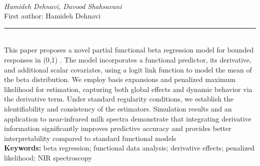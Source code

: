 \documentclass[10pt,twoside]{article}
\begin{document}
\noindent\begin{minipage}[t][\textheight]{\textwidth}
\\[0.35em]
{\itshape Hamideh Dehnavi, Davood Shahsavani}\\[0.2em]
{\footnotesize First author: Hamideh Dehnavi}\\[0.45em]
\noindent\rule{\textwidth}{0.3pt}\\[0.4em]
{\footnotesize This paper proposes a novel partial functional beta regression model for bounded responses in (0,1) . The model incorporates a functional predictor, its derivative, and additional scalar covariates, using a logit link function to model the mean of the beta distribution. We employ basis expansions and penalized maximum likelihood for estimation, capturing both global effects and dynamic behavior via the derivative term. Under standard regularity conditions, we establish the identifiability and consistency of the estimators. Simulation results and an application to near-infrared milk spectra demonstrate that integrating derivative information significantly improves predictive accuracy and provides better interpretability compared to standard functional models}\\[0.4em]
{\footnotesize\bfseries Keywords:} {\footnotesize beta regression; functional data analysis; derivative effects; penalized likelihood; NIR spectroscopy}\\[0.15em]
\vfill
\end{minipage}
\newpage
\end{document}
